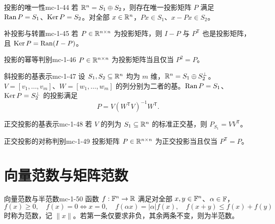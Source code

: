 \begin{theorem}{投影的唯一性}{mc-1-44}
若 $\mathbb{R}^n=S_1\oplus S_2$，则存在唯一投影矩阵 $P$ 满足 $\operatorname{Ran} P=S_1$、$\operatorname{Ker} P=S_2$。对全部 $x\in\mathbb{R}^n$，$Px\in S_1$、$x-Px\in S_2$。
\end{theorem}

\begin{lemma}{补投影与转置}{mc-1-45}
若 $P\in\mathbb{R}^{n\times n}$ 为投影矩阵，则 $I-P$ 与 $P^{\mathsf T}$ 也是投影矩阵，且 $\operatorname{Ker} P=\operatorname{Ran}(I-P)$。
\end{lemma}

\begin{theorem}{投影的幂等判别}{mc-1-46}
$P\in\mathbb{R}^{n\times n}$ 为投影矩阵当且仅当 $P^2=P$。
\end{theorem}

\begin{theorem}{斜投影的基表示}{mc-1-47}
设 $S_1,S_2\subseteq\mathbb{R}^n$ 均为 $m$ 维，$\mathbb{R}^n=S_1\oplus S_2^\perp$。$V=[v_1,\ldots,v_m]$、$W=[w_1,\ldots,w_m]$ 的列分别为二者的基。$\operatorname{Ran} P=S_1$、$\operatorname{Ker} P=S_2^\perp$ 的投影满足
\[P=V(W^{\mathsf T}V)^{-1}W^{\mathsf T}.\]
\end{theorem}

\begin{corollary}{正交投影的基表示}{mc-1-48}
若 $V$ 的列为 $S_1\subseteq\mathbb{R}^n$ 的标准正交基，则 $P_{S_1}=VV^{\mathsf T}$。
\end{corollary}

\begin{theorem}{正交投影的对称判别}{mc-1-49}
投影矩阵 $P\in\mathbb{R}^{n\times n}$ 为正交投影当且仅当 $P^{\mathsf T}=P$。
\end{theorem}

\section{向量范数与矩阵范数}

\begin{definition}{向量范数与半范数}{mc-1-50}
函数 $f:\mathbb{F}^n\to\mathbb{R}$ 满足对全部 $x,y\in\mathbb{F}^n$、$\alpha\in\mathbb{F}$，
\[f(x)\geq0,\quad f(x)=0\iff x=0,\quad f(\alpha x)=|\alpha|f(x),\quad f(x+y)\leq f(x)+f(y)\]
时称为范数，记 $\|x\|$。若第一条仅要求非负，其余两条不变，则为半范数。
\end{definition}

